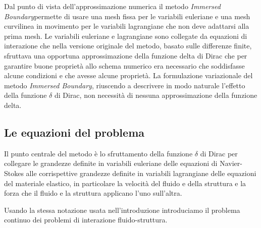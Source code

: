 \documentclass{book}
\newcommand{\IB}{\textit{Immersed Boundary}}
\begin{document}
Dal punto di vista dell'approssimazione numerica il metodo \IB permette di usare una mesh fissa per le variabili euleriane e una mesh curvilinea in movimento per le variabili lagrangiane che non deve adattarsi alla prima mesh. Le variabili euleriane e lagrangiane sono collegate da equazioni di interazione che nella versione originale del metodo, basato sulle differenze finite, sfruttava una opportuna approssimazione della funzione delta di Dirac che per garantire buone proprietà allo schema numerico era necessario che soddisfasse alcune condizioni e che avesse alcune proprietà. La formulazione variazionale del metodo \IB, riuscendo a descrivere in modo naturale l'effetto della funzione $\delta$ di Dirac, non necessità di nessuna approssimazione della funzione delta.

\subsection{Le equazioni del problema}

Il punto centrale del metodo è lo sfruttamento della funzione $\delta$ di Dirac per collegare le grandezze definite in variabili euleriane delle equazioni di Navier-Stokes alle corrispettive grandezze definite in variabili lagrangiane delle equazioni del materiale elastico, in particolare la velocità del fluido e della struttura e la forza che il fluido e la struttura applicano l'uno sull'altra.

Usando la stessa notazione usata nell'introduzione introduciamo il problema continuo dei problemi di interazione fluido-struttura.
\end{document}
